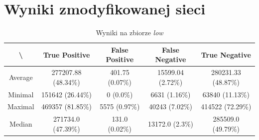 \newpage
\section{Wyniki zmodyfikowanej sieci}
\label{sec:wyniki_zmodyfikowanej}

\begin{table}[!h]
	\centering
	\caption{Wyniki na zbiorze \textit{low}}
	\vspace{6pt}
	{\footnotesize
		\begin{tabular}{|c|c|c|c|c|}
			\hline \textbackslash & True Positive & False Positive & False Negative & True Negative \\
      \hline Average & 277207.88 (48.34\%) & 401.75 (0.07\%) & 15599.04 (2.72\%) & 280231.33 (48.87\%) \\
      \hline Minimal & 151642 (26.44\%) & 0 (0.0\%) & 6631 (1.16\%) & 63840 (11.13\%) \\
      \hline Maximal & 469357 (81.85\%) & 5575 (0.97\%) & 40243 (7.02\%) & 414522 (72.29\%) \\
      \hline Median & 271734.0 (47.39\%) & 131.0 (0.02\%) & 13172.0 (2.3\%) & 285509.0 (49.79\%) \\
      \hline
		\end{tabular}
	}
	\vspace{0pt}
\end{table}

\vspace{1cm}

